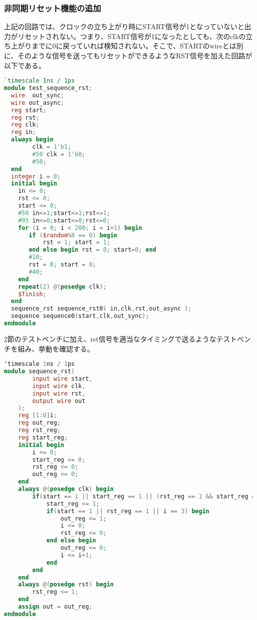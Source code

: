 \documentclass{ltjsarticle}
\begin{document}
\subsubsection{非同期リセット機能の追加}
上記の回路では、クロックの立ち上がり時にSTART信号が1となっていないと出力がリセットされない。つまり、START信号が1になったとしても、次のclkの立ち上がりまでに0に戻っていれば検知されない。そこで、STARTのwireとは別に、そのような信号を送ってもリセットができるようなRST信号を加えた回路が以下である。
\begin{lstlisting}[caption=rst機能付き順序回路デザイン,language=verilog]
`timescale 1ns / 1ps
module test_sequence_rst;
  wire	out_sync;
  wire out_async;
  reg start;
  reg rst;
  reg clk;
  reg in;
  always begin
        clk = 1'b1;
        #50 clk = 1'b0;
        #50;
  end
  integer i = 0;
  initial begin
	in <= 0;
	rst <= 0;
	start <= 0;
	#50 in<=1;start<=1;rst<=1;
	#95 in<=0;start<=0;rst<=0;
	for (i = 0; i < 200; i = i+1) begin
	   if ($random%8 == 0) begin
	       rst = 1; start = 1;
	   end else begin rst = 0; start=0; end
	   #10;
	   rst = 0; start = 0;
	   #40;
	end
	repeat(2) @(posedge clk);
	$finish;
  end
  sequence_rst sequence_rst0( in,clk,rst,out_async );
  sequence sequence0(start,clk,out_sync);
endmodule
\end{lstlisting}
2節のテストベンチに加え、rst信号を適当なタイミングで送るようなテストベンチを組み、挙動を確認する。
\begin{lstlisting}[caption=リセット付き順序回路デザイン,language=verilog]
'timescale 1ns / 1ps
module sequence_rst(
        input wire start,
        input wire clk,
        input wire rst,
        output wire out
    );
    reg [1:0]i;
    reg out_reg;
    reg rst_reg;
    reg start_reg;
    initial begin
        i <= 0;
        start_reg <= 0;
        rst_reg <= 0;
        out_reg <= 0;
    end
    always @(posedge clk) begin
        if(start == 1 || start_reg == 1 || (rst_reg == 1 && start_reg == 1)) begin
            start_reg <= 1;
            if(start == 1 || rst_reg == 1 || i == 3) begin
                out_reg <= 1;
                i <= 0;
                rst_reg <= 0;
            end else begin
                out_reg <= 0;
                i <= i+1;
            end
        end
    end
    always @(posedge rst) begin
        rst_reg <= 1;
    end
    assign out = out_reg;
endmodule
\end{lstlisting}
\end{document}
